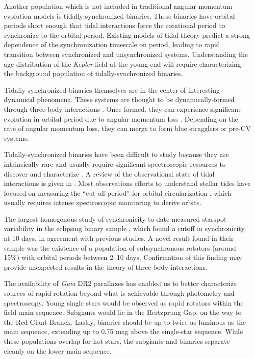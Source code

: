 \documentclass[manuscript]{aastex6}
\newcommand{\Kepler}{\mbox{\textit{Kepler}}}
\newcommand{\Gaia}{\mbox{\textit{Gaia}}}
\begin{document}
Another population which is not included in traditional angular momentum
evolution models is tidally-synchronized binaries. These binaries have orbital 
periods short enough that tidal interactions force the rotational period to
synchronize to the orbital period. Existing models of tidal theory 
\citep{Zahn77} predict a strong dependence of the synchronization timescale 
on period, leading to rapid transition between
synchronized and unsynchronized systems. Understanding the 
age distribution of the \Kepler{} field at the young end will require 
characterizing the background population of tidally-synchronized binaries.

Tidally-synchronized binaries themselves are in the center of interesting
dynamical phenomena. These systems are thought to be dynamically-formed 
through three-body interactions \citep{Tokovinin06, Fabrycky07}. Once formed, they can experience significant
evolution in orbital period due to angular momentum loss \citep{Andronov06}.
Depending on the rate of angular momentum loss, they can merge to form blue 
stragglers or pre-CV systems.

Tidally-synchronized binaries have been difficult to study because they are 
intrinsically rare and usually require significant spectroscopic resources 
to discover and characterize \citep{Mathieu90, Raghavan10, Geller15}. A review 
of the observational state of tidal interactions is given in \citet{Mazeh08}. 
Most observations efforts to understand stellar tides have focused on 
measuring the ``cut-off period'' for orbital circularization \citep{Mayor84},
which usually requires intense spectroscopic monitoring to derive orbits.

The largest homogenous study of synchronicity to date measured starspot 
variability in the eclipsing binary sample \citep{Lurie17}, which found a
cutoff in synchronicity at 10 days, in agreement with previous studies. A novel
result found in their sample was the existence of a population of
subsynchronous rotators (around 15\%) with orbital periods between 2--10 days.
Confirmation of this finding may provide unexpected results in the theory of
three-body interactions.

The availability of \Gaia{} DR2 parallaxes \citep{Gaia18,Lindegren18} has
enabled us to better characterize sources of rapid rotation beyond what is
achievable through photometry and spectroscopy. Young single stars would be
observed as rapid rotators within the field main sequence. Subgiants would lie 
in the Hertzprung Gap, on the way to the Red Giant Branch. Lastly, binaries 
should be up to twice as luminous as the main sequence, extending up to 0.75 
mag above the single-star sequence.  While these populations overlap for hot 
stars, the subgiants and binaries separate cleanly on the lower main sequence.
\end{document}
